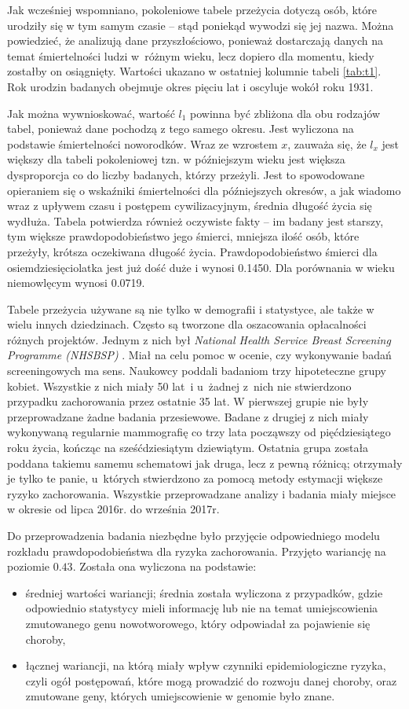 \documentclass[licencjacka]{pwr_wmat_praca_dyplomowa}
\theoremstyle{plain}
\numberwithin{theorem}{chapter}
\theoremstyle{definition}
\numberwithin{theorem}{chapter}
\begin{document}
Jak wcześniej wspomniano, pokoleniowe tabele przeżycia dotyczą osób, które urodziły się w tym samym czasie -- stąd poniekąd wywodzi się jej nazwa. Można powiedzieć, że analizują dane przyszłościowo, ponieważ dostarczają danych na temat śmiertelności ludzi w~różnym wieku, lecz dopiero dla momentu, kiedy zostałby on osiągnięty. Wartości ukazano w ostatniej kolumnie tabeli \ref{tab:t1}. Rok urodzin badanych obejmuje okres pięciu lat i oscyluje wokół roku 1931. 

Jak można wywnioskować, wartość $l_1$ powinna być zbliżona dla obu rodzajów tabel, ponieważ dane pochodzą z tego samego okresu. Jest wyliczona na podstawie śmiertelności noworodków. Wraz ze wzrostem $x$, zauważa się, że $l_x$ jest większy dla tabeli pokoleniowej tzn. w późniejszym wieku jest większa dysproporcja co do liczby badanych, którzy przeżyli. Jest to spowodowane opieraniem się o wskaźniki śmiertelności dla późniejszych okresów, a jak wiadomo wraz z upływem czasu i postępem cywilizacyjnym, średnia długość życia się wydłuża. Tabela potwierdza również oczywiste fakty -- im badany jest starszy, tym większe prawdopodobieństwo jego śmierci, mniejsza ilość osób, które przeżyły, krótsza oczekiwana długość życia. Prawdopodobieństwo śmierci dla osiemdziesięciolatka jest już dość duże i wynosi 0.1450. Dla porównania w wieku niemowlęcym wynosi 0.0719.


Tabele przeżycia używane są nie tylko w demografii i statystyce, ale także w wielu innych dziedzinach. Często są tworzone dla oszacowania opłacalności różnych projektów. Jednym z nich był \textit{National Health Service Breast Screening Programme (NHSBSP)} \cite{bcancer}. Miał na celu pomoc w ocenie, czy wykonywanie badań screeningowych ma sens. Naukowcy poddali badaniom trzy hipoteteczne grupy kobiet. Wszystkie z nich miały 50 lat~i u~żadnej z~nich nie stwierdzono przypadku zachorowania przez ostatnie 35 lat. W pierwszej grupie nie były przeprowadzane żadne badania przesiewowe. Badane z drugiej z nich miały wykonywaną regularnie mammografię co trzy lata począwszy od pięćdziesiątego roku życia, kończąc na sześćdziesiątym dziewiątym. Ostatnia grupa została poddana takiemu samemu schematowi jak druga, lecz z pewną różnicą; otrzymały je tylko te panie, u~których stwierdzono za pomocą metody estymacji większe ryzyko zachorowania. Wszystkie przeprowadzane analizy i badania miały miejsce w okresie od lipca 2016r. do września 2017r.


Do przeprowadzenia badania niezbędne było przyjęcie odpowiedniego modelu rozkładu prawdopodobieństwa dla ryzyka zachorowania. Przyjęto wariancję na poziomie $0.43$. Została ona wyliczona na podstawie:
\begin{itemize}
	\item średniej wartości wariancji; średnia została wyliczona z przypadków, gdzie odpowiednio statystycy mieli informację lub nie na temat umiejscowienia zmutowanego genu nowotworowego, który odpowiadał za pojawienie się choroby,
	\item łącznej wariancji, na którą miały wpływ czynniki epidemiologiczne ryzyka, czyli ogół postępowań, które mogą prowadzić do rozwoju danej choroby, oraz  zmutowane geny, których umiejscowienie w genomie było znane.
\end{itemize}
\end{document}
